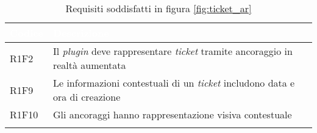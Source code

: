 {
    \setlength{\freewidth}{\dimexpr\textwidth-10\tabcolsep}
    \renewcommand{\arraystretch}{1.5}
    \centering
    \setlength{\aboverulesep}{0pt}
    \setlength{\belowrulesep}{0pt}
    \begin{longtable}{C{.15\freewidth} C{.965\freewidth}}
       \toprule
    \textcolor{white}{\textbf{Codice}}&
    \textcolor{white}{\textbf{Descrizione}}\\
    \toprule
    \endhead

    R1F2 & Il \textit{plugin} deve rappresentare \textit{ticket} tramite ancoraggio in realtà aumentata\\
    R1F9 & Le informazioni contestuali di un \textit{ticket} includono data e ora di creazione\\
    R1F10 & Gli ancoraggi hanno rappresentazione visiva contestuale\\ 
  
    \bottomrule
    \caption{Requisiti soddisfatti in figura \ref{fig:ticket_ar}}
    \end{longtable}
}



